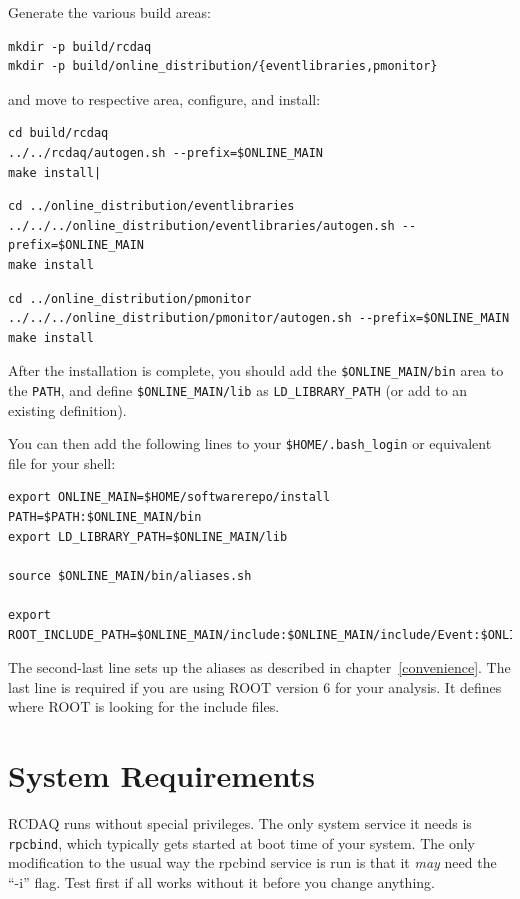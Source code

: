 \documentclass{article}[11pt]
\begin{document}
Generate the various build areas:

\begin{verbatim}
mkdir -p build/rcdaq
mkdir -p build/online_distribution/{eventlibraries,pmonitor}
\end{verbatim}

and move to respective area, configure, and install:

\begin{verbatim}
cd build/rcdaq
../../rcdaq/autogen.sh --prefix=$ONLINE_MAIN
make install|
\end{verbatim}

\begin{verbatim}
cd ../online_distribution/eventlibraries
../../../online_distribution/eventlibraries/autogen.sh --prefix=$ONLINE_MAIN
make install
\end{verbatim}

\begin{verbatim}
cd ../online_distribution/pmonitor
../../../online_distribution/pmonitor/autogen.sh --prefix=$ONLINE_MAIN
make install
\end{verbatim}


After the installation is complete, you should add the
\verb|$ONLINE_MAIN/bin| area to the \verb|PATH|, and define
\verb|$ONLINE_MAIN/lib| as \verb|LD_LIBRARY_PATH| (or add to an
existing definition).

You can then add the following lines to your
\verb|$HOME/.bash_login| or equivalent file for your shell:

\begin{verbatim}
export ONLINE_MAIN=$HOME/softwarerepo/install
PATH=$PATH:$ONLINE_MAIN/bin
export LD_LIBRARY_PATH=$ONLINE_MAIN/lib

source $ONLINE_MAIN/bin/aliases.sh

export ROOT_INCLUDE_PATH=$ONLINE_MAIN/include:$ONLINE_MAIN/include/Event:$ONLINE_MAIN/include/pmonitor
\end{verbatim}

The second-last line sets up the aliases as described in
chapter~\ref{convenience}. The last line is required if you are using
ROOT version 6 for your analysis. It defines where ROOT is looking for
the include files.



\section{System Requirements}

RCDAQ runs without special privileges. The only system service it
needs is \verb|rpcbind|, which typically gets started at boot time of
your system. The only modification to the usual way the rpcbind
service is run is that it \emph{may} need the ``-i'' flag. Test first
if all works without it before you change anything.
\end{document}
